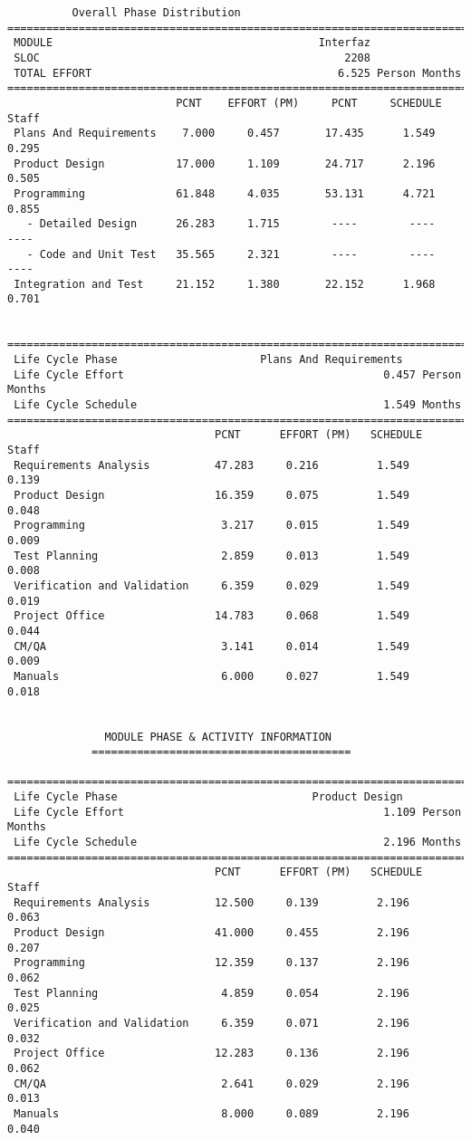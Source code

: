 \documentclass[11pt,a4paper,spanish,twoside]{report}
\begin{document}
{\begin{verbatim}
          Overall Phase Distribution
==============================================================================
 MODULE                                         Interfaz
 SLOC                                               2208
 TOTAL EFFORT                                      6.525 Person Months
==============================================================================
                          PCNT    EFFORT (PM)     PCNT     SCHEDULE       Staff
 Plans And Requirements    7.000     0.457       17.435      1.549       0.295
 Product Design           17.000     1.109       24.717      2.196       0.505
 Programming              61.848     4.035       53.131      4.721       0.855
   - Detailed Design      26.283     1.715        ----        ----        ----
   - Code and Unit Test   35.565     2.321        ----        ----        ----
 Integration and Test     21.152     1.380       22.152      1.968       0.701


==============================================================================
 Life Cycle Phase                      Plans And Requirements
 Life Cycle Effort                                        0.457 Person Months
 Life Cycle Schedule                                      1.549 Months
==============================================================================
                                PCNT      EFFORT (PM)   SCHEDULE       Staff   
 Requirements Analysis          47.283     0.216         1.549        0.139
 Product Design                 16.359     0.075         1.549        0.048
 Programming                     3.217     0.015         1.549        0.009
 Test Planning                   2.859     0.013         1.549        0.008
 Verification and Validation     6.359     0.029         1.549        0.019
 Project Office                 14.783     0.068         1.549        0.044
 CM/QA                           3.141     0.014         1.549        0.009
 Manuals                         6.000     0.027         1.549        0.018


		       MODULE PHASE & ACTIVITY INFORMATION
		     ========================================

==============================================================================
 Life Cycle Phase                              Product Design
 Life Cycle Effort                                        1.109 Person Months
 Life Cycle Schedule                                      2.196 Months
==============================================================================
                                PCNT      EFFORT (PM)   SCHEDULE       Staff   
 Requirements Analysis          12.500     0.139         2.196        0.063
 Product Design                 41.000     0.455         2.196        0.207
 Programming                    12.359     0.137         2.196        0.062
 Test Planning                   4.859     0.054         2.196        0.025
 Verification and Validation     6.359     0.071         2.196        0.032
 Project Office                 12.283     0.136         2.196        0.062
 CM/QA                           2.641     0.029         2.196        0.013
 Manuals                         8.000     0.089         2.196        0.040


\end{verbatim}}
\end{document}
